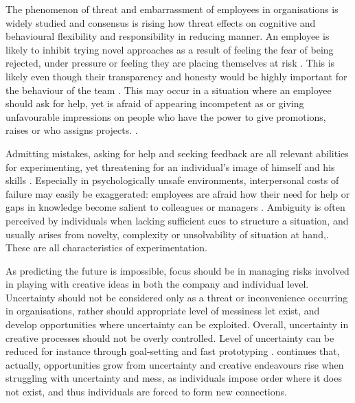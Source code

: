 The phenomenon of threat and embarrassment of employees in organisations is widely studied and consensus is rising how threat effects on cognitive and behavioural flexibility and responsibility in reducing manner. \citep{argyris1982reasoning,edmondson1999psychological,staw1989tradeoff} An employee is likely to inhibit trying novel approaches as a result of feeling the fear of being rejected, under pressure or feeling they are placing themselves at risk \citep{edmondson1999psychological}. This is likely even though their transparency and honesty would be highly important for the behaviour of the team \citep{argyris1982reasoning, edmondson1999psychological}. This may occur in a situation where an employee should ask for help, yet is afraid of appearing incompetent as or giving unfavourable impressions on people who have the power to give promotions, raises or who assigns projects. \citep{edmondson1999psychological,brown1990politeness}. 

Admitting mistakes, asking for help and seeking feedback are all relevant abilities for experimenting, yet threatening for an individual's image of himself and his skills \citep{brown1990politeness}. Especially in psychologically unsafe environments, interpersonal costs of failure may easily be exaggerated: employees are afraid how their need for help or gaps in knowledge become salient to colleagues or managers \citep{lee1997going}. Ambiguity is often perceived by individuals when lacking sufficient cues to structure a situation, and usually arises from novelty, complexity or unsolvability of situation at hand,\citep{budner1962intolerance}. These are all characteristics of experimentation. 

As predicting the future is impossible, focus should be in managing risks involved in playing with creative ideas in both the company and individual level. Uncertainty should not be considered only as a threat or inconvenience occurring in organisations, rather should appropriate level of messiness let exist, and develop opportunities where uncertainty can be exploited. Overall, uncertainty in creative processes should not be overly controlled. \citep{sternberg1997creativity} Level of uncertainty can be reduced for instance through goal-setting and fast prototyping \citep{mumford2002leading}. \citet{kanter1983change} continues that, actually, opportunities grow from uncertainty and creative endeavours rise when struggling with uncertainty and mess, as individuals impose order where it does not exist, and thus individuals are forced to form new connections. 

